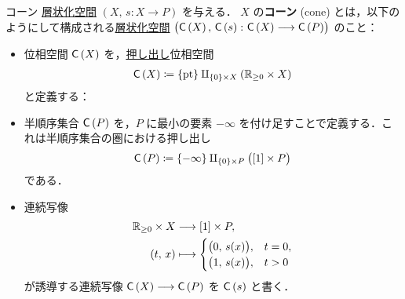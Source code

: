 \documentclass[TQFT_main]{subfiles}
\begin{document}
\begin{mydef}[label=def:str-cone]{コーン}
    \hyperref[def:stratified-space]{層状化空間} $(X,\, s \colon X \to P)$ を与える．
    $X$ の\textbf{コーン} (cone) とは，以下のようにして構成される\hyperref[def:stratified-space]{層状化空間} $\bigl( \mathsf{C}\left( X \right),\, \mathsf{C}\left( s \right) \colon \mathsf{C}\left( X \right) \longrightarrow \mathsf{C}\left( P \right) \bigr)$ のこと：
    \begin{itemize}
        \item 位相空間 $\mathsf{C}\left( X \right)$ を，\hyperref[def:pullback-pushout]{押し出し}位相空間
        \begin{align}
            \mathsf{C}\left( X \right) \coloneqq \{\mathrm{pt}\} \amalg_{\{0\} \times X} (\mathbb{R}_{\ge 0} \times X)
        \end{align}
        と定義する：
        \begin{center}
        \end{center}
        \item 半順序集合 $\mathsf{C}\left( P \right)$ を，$P$ に最小の要素 $-\infty$ を付け足すことで定義する．これは半順序集合の圏における押し出し
        \begin{align}
            \mathsf{C}\left( P \right) \coloneqq \{-\infty\} \amalg_{\{0\} \times P} \bigl( [1] \times P \bigr) 
        \end{align}
        である．
        \item 連続写像
        \begin{align}
            \mathbb{R}_{\ge 0} \times X &\longrightarrow [1] \times P, \\
            (t,\, x) &\longmapsto 
            \begin{cases}
                \bigl( 0,\, s(x) \bigr), &t=0, \\
                \bigl( 1,\, s(x) \bigr), &t>0
            \end{cases}
        \end{align}
        が誘導する連続写像 $\mathsf{C}\left( X \right) \longrightarrow \mathsf{C}\left( P \right)$ を $\mathsf{C}\left( s \right)$ と書く．
    \end{itemize}
\end{mydef}
\end{document}
